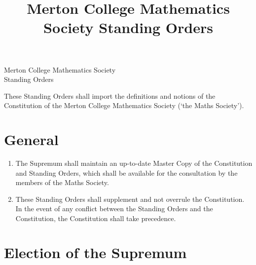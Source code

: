 \documentclass[pdftex,a4paper]{report}
\title{Merton College Mathematics Society Standing Orders}
\begin{document}
\begin{center}

	{\large Merton College Mathematics Society} \\[5pt]
	{\Huge Standing Orders}

\end{center}

These Standing Orders shall import the definitions and notions of the Constitution of the Merton College Mathematics Society (`the Maths Society').


\section*{General}

\begin{enumerate}[label=\arabic*)]
	\item The Supremum shall maintain an up-to-date Master Copy of the Constitution and Standing Orders, which shall be available for the consultation by the members of the Maths Society.
	\item These Standing Orders shall supplement and not overrule the Constitution. In the event of any conflict between the Standing Orders and the Constitution, the Constitution shall take precedence.
\end{enumerate}


\section*{Election of the Supremum}
\end{document}
